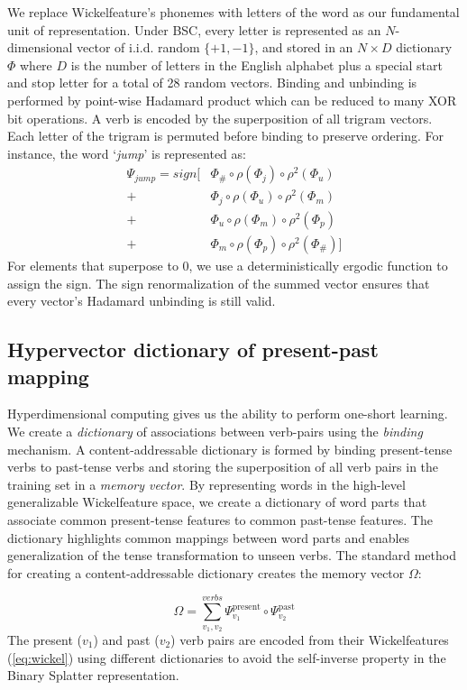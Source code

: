 \documentclass{article}
\begin{document}
We replace Wickelfeature's phonemes with letters of the word as our fundamental unit of representation. Under BSC, every letter is represented as an $N$-dimensional vector of i.i.d. random $\{+1, -1\}$, and stored in an $N \times D$ dictionary $\Phi$ where $D$ is the number of letters in the English alphabet plus a special start and stop letter for a total of 28 random vectors. Binding and unbinding is performed by point-wise Hadamard product which can be reduced to many XOR bit operations. A verb is encoded by the superposition of all trigram vectors. Each letter of the trigram is permuted before binding to preserve ordering. For instance, the word `\emph{jump}' is represented as:
\begin{align}
\label{eq:wickel}
\Psi_{jump} = sign [& \Phi_{\#} \circ \rho(\Phi_{j}) \circ \rho^2(\Phi_{u}) \\
    	+ & \Phi_j \circ \rho(\Phi_u) \circ \rho^2 (\Phi_m) \nonumber \\
        + & \Phi_u \circ \rho(\Phi_m) \circ \rho^2(\Phi_p) \nonumber \\
        + & \Phi_m \circ \rho(\Phi_p) \circ \rho^2 (\Phi_{\#}) ] \nonumber
\end{align}
For elements that superpose to 0, we use a deterministically ergodic function to assign the sign. The sign renormalization of the summed vector ensures that every vector's Hadamard unbinding is still valid. 


\subsection{Hypervector dictionary of present-past mapping}

Hyperdimensional computing gives us the ability to perform one-short learning. We create a \emph{dictionary} of associations between verb-pairs using the \emph{binding} mechanism. A content-addressable dictionary is formed by binding present-tense verbs to past-tense verbs and storing the superposition of all verb pairs in the training set in a \emph{memory vector}. By representing words in the high-level generalizable Wickelfeature space, we create a dictionary of word parts that associate common present-tense features to common past-tense features. The dictionary highlights common mappings between word parts and enables generalization of the tense transformation to unseen verbs. The standard method for creating a content-addressable dictionary creates the memory vector $\Omega$:

\begin{equation}
\Omega = \sum_{v_1, v_2}^{verbs} \Psi^{\text{present}}_{v_1} \circ \Psi^{\text{past}}_{v_2}
\end{equation}
The present ($v_1$) and past ($v_2$) verb pairs are encoded from their Wickelfeatures (\ref{eq:wickel}) using different dictionaries to avoid the self-inverse property in the Binary Splatter representation. 
\end{document}
